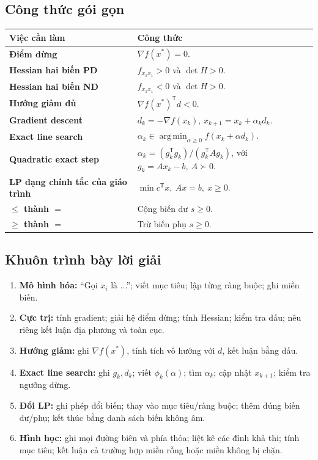 \documentclass[11pt,a4paper]{article}
\newcommand{\grad}{\nabla}
\newcommand{\T}{^{\mathsf T}}
\DeclareMathOperator*{\argmin}{arg\,min}
\begin{document}
\subsection{Công thức gói gọn}
\begin{center}
\begin{tabularx}{.96\textwidth}{>{\bfseries}p{}Y}
\toprule
Việc cần làm & Công thức\\
\midrule
Điểm dừng & \(\grad f(x^\ast)=0\).\\
Hessian hai biến PD & \(f_{x_1x_1}>0\) và \(\det H>0\).\\
Hessian hai biến ND & \(f_{x_1x_1}<0\) và \(\det H>0\).\\
Hướng giảm đủ & \(\grad f(x^\ast)\T d<0\).\\
Gradient descent & \(d_k=-\grad f(x_k)\), \(x_{k+1}=x_k+\alpha_kd_k\).\\
Exact line search & \(\alpha_k\in\argmin_{\alpha\ge0}f(x_k+\alpha d_k)\).\\
Quadratic exact step & \(\alpha_k=(g_k\T g_k)/(g_k\T Ag_k)\), với \(g_k=Ax_k-b,\ A\succ0\).\\
LP dạng chính tắc của giáo trình & \(\min c\T x,\ Ax=b,\ x\ge0\).\\
\(\le\) thành \(=\) & Cộng biến dư \(s\ge0\).\\
\(\ge\) thành \(=\) & Trừ biến phụ \(s\ge0\).\\
\bottomrule
\end{tabularx}
\end{center}

\subsection{Khuôn trình bày lời giải}
\begin{enumerate}
\item \textbf{Mô hình hóa:} “Gọi \(x_i\) là ...”; viết mục tiêu; lập từng ràng buộc; ghi miền biến.
\item \textbf{Cực trị:} tính gradient; giải hệ điểm dừng; tính Hessian; kiểm tra dấu; nêu riêng kết luận địa phương và toàn cục.
\item \textbf{Hướng giảm:} ghi \(\grad f(x^\ast)\), tính tích vô hướng với \(d\), kết luận bằng dấu.
\item \textbf{Exact line search:} ghi \(g_k,d_k\); viết \(\phi_k(\alpha)\); tìm \(\alpha_k\); cập nhật \(x_{k+1}\); kiểm tra ngưỡng dừng.
\item \textbf{Đổi LP:} ghi phép đổi biến; thay vào mục tiêu/ràng buộc; thêm đúng biến dư/phụ; kết thúc bằng danh sách biến không âm.
\item \textbf{Hình học:} ghi mọi đường biên và phía thỏa; liệt kê các đỉnh khả thi; tính mục tiêu; kết luận cả trường hợp miền rỗng hoặc miền không bị chặn.
\end{enumerate}
\end{document}
